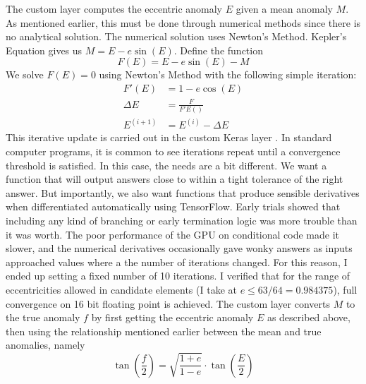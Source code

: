 The custom layer  computes the eccentric anomaly $E$ given a mean anomaly $M$.
As mentioned earlier, this must be done through numerical methods since there is no analytical solution.
The numerical solution uses Newton's Method.
Kepler's Equation gives us $M = E - e \sin(E)$.
Define the function
$$F(E) = E - e \sin(E) - M$$
We solve $F(E) = 0 $ using Newton's Method with the following simple iteration:
\begin{align*}
F'(E) &= 1 - e \cos(E) \\
\Delta E &= \frac{F}{F'E()} \\
E^{(i+1)} &= E^{(i)} - \Delta E
\end{align*}
This iterative update is carried out in the custom Keras layer .
In standard computer programs, it is common to see iterations repeat until a convergence threshold is satisfied.
In this case, the needs are a bit different.
We want a function that will output answers close to within a tight tolerance of the right answer.
But importantly, we also want functions that produce sensible derivatives when differentiated automatically using TensorFlow.
Early trials showed that including any kind of branching or early termination logic was more trouble than it was worth.
The poor performance of the GPU on conditional code made it slower, 
and the numerical derivatives occasionally gave wonky answers as inputs approached values where a the number of iterations changed.
For this reason, I ended up setting a fixed number of 10 iterations.
I verified that for the range of eccentricities allowed in candidate elements (I take at $ e \le 63/64 = 0.984375$), 
full convergence on 16 bit floating point is achieved.
The custom layer  converts $M$ to the true anomaly $f$ by first getting the eccentric anomaly $E$
as described above, then using the relationship mentioned earlier between the mean and true anomalies, namely
$$ \tan \left(\frac{f}{2} \right) = \sqrt{\frac{1+e}{1-e}} \cdot \tan \left( \frac{E}{2} \right)$$

